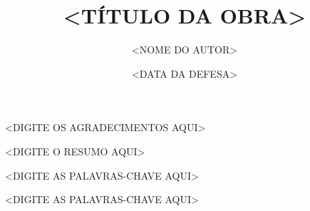 \documentclass[phd, a4paper, classic]{ufbathesis}
\title{<TÍTULO DA OBRA>}
\date{<DATA DA DEFESA>}
\author{<NOME DO AUTOR>}
\begin{document}
\frontmatter

\frontpage

\presentationpage

\acknowledgements
<DIGITE OS AGRADECIMENTOS AQUI>

\resumo
<DIGITE O RESUMO AQUI>
\begin{keywords}
<DIGITE AS PALAVRAS-CHAVE AQUI>
\end{keywords}

\abstract
\begin{keywords}
<DIGITE AS PALAVRAS-CHAVE AQUI>
\end{keywords}

\tableofcontents

\listoffigures

\listoftables

\mainmatter

% 
% 
% 

\backmatter

\appendix

% 
% 
% 





\end{document}

